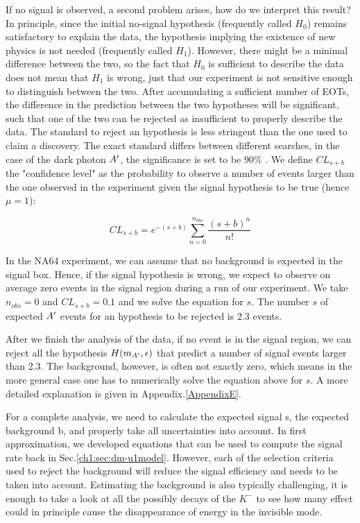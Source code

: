 If no signal is observed, a second problem arises, how do we interpret this result? In principle, since the initial no-signal hypothesis (frequently called $H_0$) remains satisfactory to explain the data, the hypothesis implying the existence of new physics is not needed (frequently called $H_1$). However, there might be a minimal difference between the two, so the fact that $H_0$ is sufficient to describe the data does not mean that $H_1$ is wrong, just that our experiment is not sensitive enough to distinguish between the two. After accumulating a sufficient number of EOTs, the difference in the prediction between the two hypotheses will be significant, such that one of the two can be rejected as insufficient to properly describe the data. The standard to reject an hypothesis is less stringent than the one used to claim a discovery. The exact standard differs between different searches, in the case of the dark photon $A'$, the significance is set to be 90\% \cite{battaglieri2017cosmic}. We define $CL_{s+b}$ the "confidence level" as the probability to observe a number of events larger than the one observed in the experiment given the signal hypothesis to be true (hence $\mu = 1$):

\begin{equation}
  \label{eq:confidence-level-poisson}
  CL_{s+b} = e^{-(s+b)}\sum^{n_{obs}}_{n=0} \frac{(s+b)^n}{n!}
\end{equation}

In the NA64 experiment, we can assume that no background is expected in the signal box. Hence, if the signal hypothesis is wrong, we expect to observe on average zero events in the signal region during a run of our experiment. We take $n_{obs} = 0$ and $CL_{s+b} = 0.1$ and we solve the equation for $s$. The number $s$ of expected $A'$ events for an hypothesis to be rejected is 2.3 events.

After we finish the analysis of the data, if no event is in the signal region, we can reject all the hypothesis $H(m_{A'}, \epsilon)$ that predict a number of signal events larger than 2.3. The background, however, is often not exactly zero, which means in the more general case one has to numerically solve the equation above for $s$. A more detailed explanation is given in Appendix.\ref{AppendixE}.

For a complete analysis, we need to calculate the expected signal s, the expected background b, and properly take all uncertainties into account. In first approximation, we developed equations that can be used to compute the signal rate back in Sec.\ref{ch1:sec:dm-u1model}. However, each of the selection criteria used to reject the background will reduce the signal efficiency and needs to be taken into account. Estimating the background is also typically challenging, it is enough to take a look at all the possibly decays of the $K^-$\cite{particle-strange-mesons} to see how many effect could in principle cause the disappearance of energy in the invisible mode.


